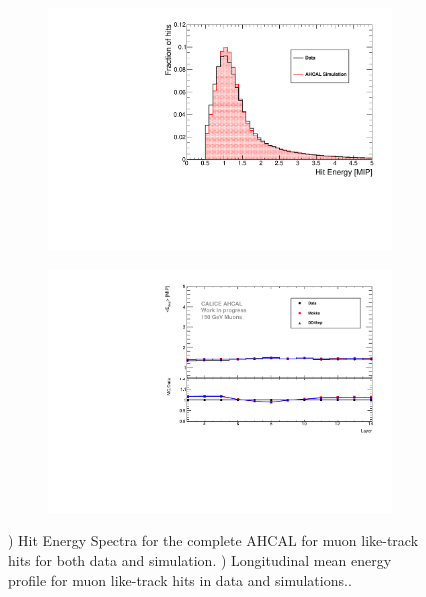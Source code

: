 \documentclass{JINST}
\begin{document}
\begin{figure}[htbp!]
  \centering
  \begin{subfigure}[t]{0.49\textwidth}
    \includegraphics[width=1\linewidth]{fig/ComparisonMCData_MIPPeak.pdf}
    \caption{} \label{fig:MIPData_MC}
  \end{subfigure}
  \hfill
  \begin{subfigure}[t]{0.49\textwidth}
    \includegraphics[width=1\linewidth]{fig/ProfileMuons_Edep.pdf}
    \caption{} \label{fig:ProfileMIP_Edep}
  \end{subfigure}
  \caption{) Hit Energy Spectra for the complete AHCAL for muon like-track hits for both data and simulation. ) Longitudinal mean energy profile for muon like-track hits in data and simulations..}
  \label{fig:Val}
\end{figure}
\end{document}
